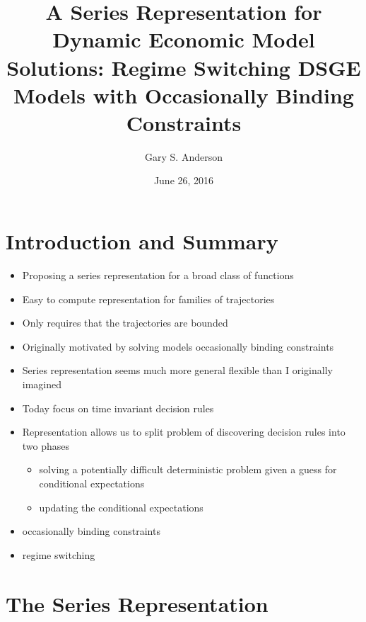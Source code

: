 \documentclass[tikz]{beamer}
\begin{document}
\title[A Series Representation  for Solving  Models]{A Series Representation for Dynamic Economic Model Solutions: Regime Switching DSGE Models with Occasionally Binding Constraints }


\author{Gary S. Anderson}
\date{June 26, 2016} 


\frame{\titlepage}

\section{Introduction and Summary}

\begin{frame}

 \begin{itemize}
 \item Proposing a series representation for a broad class of functions
 \item Easy to compute representation for 
families of trajectories
\item Only requires that the trajectories are bounded
\item Originally motivated by solving models occasionally binding constraints
\item Series representation seems much more general flexible than I originally imagined
\end{itemize}
\end{frame}


\begin{frame}
     \begin{itemize}
   \item Today focus on time invariant decision rules 
   \item Representation allows us to split problem of discovering decision rules into two phases
     \begin{itemize}
     \item solving a potentially difficult deterministic problem given a guess for conditional expectations
     \item updating the conditional expectations
   \end{itemize}
     \item occasionally binding constraints
     \item regime switching
\end{itemize}

\end{frame}
\section{The Series Representation}
\end{document}

